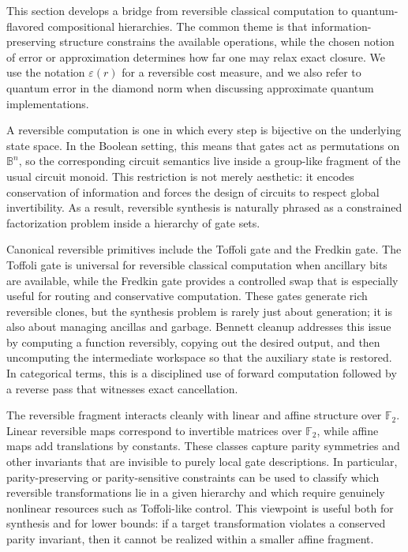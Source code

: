 This section develops a bridge from reversible classical computation to quantum-flavored compositional hierarchies. The common theme is that information-preserving structure constrains the available operations, while the chosen notion of error or approximation determines how far one may relax exact closure. We use the notation \(\varepsilon(r)\) for a reversible cost measure, and we also refer to quantum error in the diamond norm when discussing approximate quantum implementations.

A reversible computation is one in which every step is bijective on the underlying state space. In the Boolean setting, this means that gates act as permutations on \(\mathbb{B}^n\), so the corresponding circuit semantics live inside a group-like fragment of the usual circuit monoid. This restriction is not merely aesthetic: it encodes conservation of information and forces the design of circuits to respect global invertibility. As a result, reversible synthesis is naturally phrased as a constrained factorization problem inside a hierarchy of gate sets.

Canonical reversible primitives include the Toffoli gate and the Fredkin gate. The Toffoli gate is universal for reversible classical computation when ancillary bits are available, while the Fredkin gate provides a controlled swap that is especially useful for routing and conservative computation. These gates generate rich reversible clones, but the synthesis problem is rarely just about generation; it is also about managing ancillas and garbage. Bennett cleanup addresses this issue by computing a function reversibly, copying out the desired output, and then uncomputing the intermediate workspace so that the auxiliary state is restored. In categorical terms, this is a disciplined use of forward computation followed by a reverse pass that witnesses exact cancellation.

The reversible fragment interacts cleanly with linear and affine structure over \(\mathbb{F}_2\). Linear reversible maps correspond to invertible matrices over \(\mathbb{F}_2\), while affine maps add translations by constants. These classes capture parity symmetries and other invariants that are invisible to purely local gate descriptions. In particular, parity-preserving or parity-sensitive constraints can be used to classify which reversible transformations lie in a given hierarchy and which require genuinely nonlinear resources such as Toffoli-like control. This viewpoint is useful both for synthesis and for lower bounds: if a target transformation violates a conserved parity invariant, then it cannot be realized within a smaller affine fragment.

